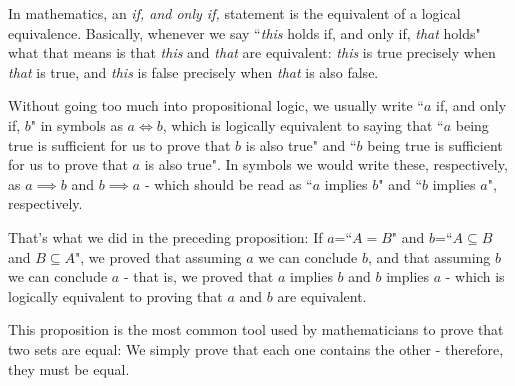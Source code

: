 \begin{rmk}
	In mathematics, an \emph{if, and only if,} statement is the equivalent of a logical equivalence. Basically, whenever we say ``\emph{this} holds if, and only if, \emph{that} holds" what that means is that \emph{this} and \emph{that} are equivalent: \emph{this} is true precisely when \emph{that} is true, and \emph{this} is false precisely when \emph{that} is also false.
	
	Without going too much into propositional logic, we usually write ``$a$ if, and only if, $b$" in symbols as $a\iff b$, which is logically equivalent to saying that ``$a$ being true is sufficient for us to prove that $b$ is also true" and ``$b$ being true is sufficient for us to prove that $a$ is also true". In symbols we would write these, respectively, as $a\implies b$ and $b\implies a$ - which should be read as ``$a$ implies $b$" and ``$b$ implies $a$", respectively.
	
	That's what we did in the preceding proposition: If $a$=``$A=B$" and $b$=``$A\subseteq B$ and $B\subseteq A$", we proved that assuming $a$ we can conclude $b$, and that assuming $b$ we can conclude $a$ - that is, we proved that $a$ implies $b$ and $b$ implies $a$ - which is logically equivalent to proving that $a$ and $b$ are equivalent.
\end{rmk}

This proposition is the most common tool used by mathematicians to prove that two sets are equal: We simply prove that each one contains the other - therefore, they must be equal.

